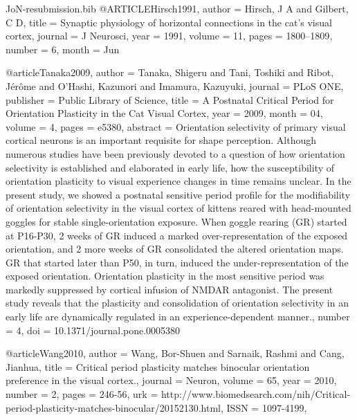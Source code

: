 \documentclass{article}
\begin{document}
\begin{filecontents}{JoN-resubmission.bib}
@ARTICLE{Hirsch1991,
  author = {Hirsch, J A and Gilbert, C D},
  title = {{{S}ynaptic physiology of horizontal connections in the cat's visual
	cortex}},
  journal = {J Neurosci},
  year = {1991},
  volume = {11},
  pages = {1800--1809},
  number = {6},
  month = {Jun}
}

@article{Tanaka2009,
    author = {Tanaka, Shigeru and Tani, Toshiki and Ribot, Jérôme and O'Hashi, Kazunori and Imamura, Kazuyuki},
    journal = {PLoS ONE},
    publisher = {Public Library of Science},
    title = {A Postnatal Critical Period for Orientation Plasticity in the Cat Visual Cortex},
    year = {2009},
    month = {04},
    volume = {4},
    pages = {e5380},
    abstract = {Orientation selectivity of primary visual cortical
                  neurons is an important requisite for shape
                  perception. Although numerous studies have been
                  previously devoted to a question of how orientation
                  selectivity is established and elaborated in early
                  life, how the susceptibility of orientation
                  plasticity to visual experience changes in time
                  remains unclear. In the present study, we showed a
                  postnatal sensitive period profile for the
                  modifiability of orientation selectivity in the
                  visual cortex of kittens reared with head-mounted
                  goggles for stable single-orientation exposure. When
                  goggle rearing (GR) started at P16-P30, 2 weeks of
                  GR induced a marked over-representation of the
                  exposed orientation, and 2 more weeks of GR
                  consolidated the altered orientation maps. GR that
                  started later than P50, in turn, induced the
                  under-representation of the exposed
                  orientation. Orientation plasticity in the most
                  sensitive period was markedly suppressed by cortical
                  infusion of NMDAR antagonist. The present study
                  reveals that the plasticity and consolidation of
                  orientation selectivity in an early life are
                  dynamically regulated in an experience-dependent
                  manner.},
    number = {4},
    doi = {10.1371/journal.pone.0005380}
}


@article{Wang2010,
author = {Wang, Bor-Shuen and Sarnaik, Rashmi and Cang, Jianhua},
title = {Critical period plasticity matches binocular orientation preference in the visual cortex.},
journal = {Neuron},
volume = {65},
year = {2010},
number = {2},
pages = {246-56},
urk = {http://www.biomedsearch.com/nih/Critical-period-plasticity-matches-binocular/20152130.html},
ISSN = {1097-4199},
}


\end{filecontents}
\end{document}
